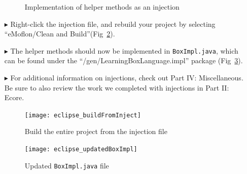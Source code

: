 \begin{itemize}
\begin{figure}[htbp]
\begin{lstlisting}[language=Java, keywordstyle={\bfseries\color{purple}}, backgroundcolor=\color{white}]
        \end{lstlisting}
        \caption{Implementation of helper methods as an injection}
        \label{code:complete_inject_file}
    \end{figure}
    \FloatBarrier

\vspace{0.5cm}

\item[$\blacktriangleright$] Right-click the injection file, and rebuild your project by selecting ``eMoflon/Clean and
Build''(Fig~\ref{fig:eclipse_buildFromInjecton}).

\item[$\blacktriangleright$] The helper methods should now be implemented in \texttt{BoxImpl.java}, which can be found under
the ``/gen/LearningBoxLanguage.impl'' package (Fig~\ref{fig:eclipse_updatedBoxImpl}).

\item[$\blacktriangleright$] For additional information on injections, check out Part IV: Miscellaneous. Be sure to also
review the work we completed with injections in Part II: Ecore.

\newpage

\vspace*{2cm}

\begin{figure}[htbp]
    \centering
    \texttt{[image: eclipse\_buildFromInject]}
    \caption{Build the entire project from the injection file}
    \label{fig:eclipse_buildFromInjecton}
\end{figure}

\newpage

\vspace*{2cm}

\begin{figure}[htbp]
    \centering
    \texttt{[image: eclipse\_updatedBoxImpl]}
    \caption{Updated \texttt{BoxImpl.java} file}
    \label{fig:eclipse_updatedBoxImpl}
\end{figure}


\end{itemize}





